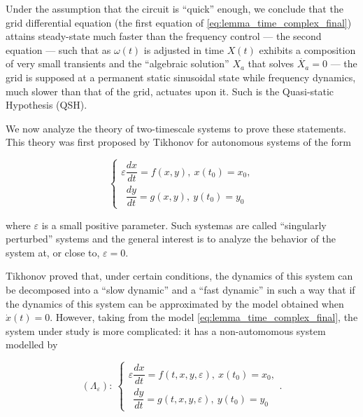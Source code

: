 	Under the assumption that the circuit is ``quick'' enough, we conclude that the grid differential equation (the first equation of \eqref{eq:lemma_time_complex_final}) attains steady-state much faster than the frequency control — the second equation — such that as $\omega(t)$ is adjusted in time $X(t)$ exhibits a composition of very small transients and the ``algebraic solution'' $X_a$ that solves $\dot{X_a} = 0$ — the grid is supposed at a permanent static sinusoidal state while frequency dynamics, much slower than that of the grid, actuates upon it. Such is the Quasi-static Hypothesis (QSH).

	We now analyze the theory of two-timescale systems to prove these statements. This theory was first proposed by Tikhonov  for autonomous systems of the form

\begin{equation} \left\{\begin{array}{l} \varepsilon \dfrac{dx}{dt} = f\left(x,y\right),\ x\left(t_0\right) = x_0, \\[3mm]\phantom{\varepsilon} \dfrac{dy}{dt} = g\left(x,y\right),\ y\left(t_0\right) = y_0 \end{array}\right. \end{equation}

	\noindent where $\varepsilon$ is a small positive parameter. Such systemas are called ``singularly perturbed'' systems  and the general interest is to analyze the behavior of the system at, or close to, $\varepsilon = 0$. 

	Tikhonov proved that, under certain conditions, the dynamics of this system can be decomposed into a ``slow dynamic'' and a ``fast dynamic'' in such a way that if the dynamics of this system can be approximated by the model obtained when $\dot{x}(t) = 0$. However, taking from the model \eqref{eq:lemma_time_complex_final}, the system under study is more complicated: it has a non-automomous system modelled by

\begin{equation}\left(\Lambda_\varepsilon\right):\ \left\{\begin{array}{l} \varepsilon \dfrac{dx}{dt} = f\left(t,x,y,\varepsilon\right),\ x\left(t_0\right) = x_0, \\[3mm]\phantom{\varepsilon} \dfrac{dy}{dt} = g\left(t,x,y,\varepsilon\right),\ y\left(t_0\right) = y_0 \end{array}\right. . \label{eq:original_single_persystem}\end{equation}

